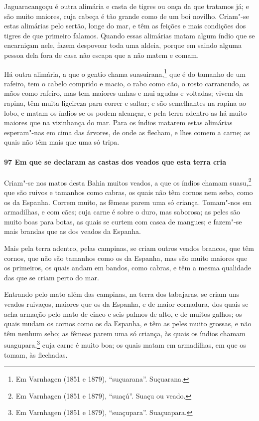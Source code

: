 \begin{linenumbers}
Jaguaracangoçu é outra alimária e casta de tigres ou onça da que tratamos já; e são muito
maiores, cuja cabeça é tão grande como de um boi novilho. Criam"-se estas alimárias pelo
sertão, longe do mar, e têm as feições e mais condições dos tigres de que primeiro
falamos. Quando essas alimárias matam algum índio que se encarniçam nele, fazem despovoar
toda uma aldeia, porque em saindo alguma pessoa dela fora de casa não escapa que a não
matem e comam.

Há outra alimária, a que o gentio chama suasuirana,\footnote{ Em Varnhagen (1851 e 1879),
``suçuarana''. Suçuarana.} que é do tamanho de um rafeiro, tem o cabelo comprido e macio,
o rabo como cão, o rosto carrancudo, as mãos como rafeiro, mas tem maiores unhas e mui
agudas e voltadas; vivem da rapina, têm muita ligeireza para correr e saltar; e são
semelhantes na rapina ao lobo, e matam os índios se os podem alcançar, e pela terra
adentro as há muito maiores que na vizinhança do mar. Para os índios matarem estas
alimárias esperam"-nas em cima das árvores, de onde as flecham, e lhes comem a carne; as
quais não têm mais que uma só tripa.

\paragraph{97 Em que se declaram as castas dos veados que esta terra cria}\quad
Criam"-se nos matos desta Bahia muitos veados, a que os índios chamam suasu,\footnote{ Em
Varnhagen (1851 e 1879), ``suaçú''. Suaçu ou veado.} que são ruivos e tamanhos como
cabras, os quais não têm cornos nem sebo, como os da Espanha. Correm muito, as fêmeas
parem uma só criança. Tomam"-nos em armadilhas, e com cães; cuja carne é sobre o duro, mas
saborosa; as peles são muito boas para botas, as quais se curtem com casca de mangues; e
fazem"-se mais brandas que as dos veados da Espanha.

Mais pela terra adentro, pelas campinas, se criam outros veados brancos, que têm cornos,
que não são tamanhos como os da Espanha, mas são muito maiores que os primeiros, os quais
andam em bandos, como cabras, e têm a mesma qualidade das que se criam perto do mar.

Entrando pelo mato além das campinas, na terra dos tabajaras, se criam uns veados
ruivaços, maiores que os da Espanha, e de maior cornadura, dos quais se acha armação pelo
mato de cinco e seis palmos de alto, e de muitos galhos; os quais mudam os cornos como os
da Espanha, e têm as peles muito grossas, e não têm nenhum sebo; as fêmeas parem uma só
criança, às quais os índios chamam suagupara,\footnote{ Em Varnhagen (1851 e 1879),
``suaçupara''. Suaçuapara.} cuja carne é muito boa; os quais matam em armadilhas, em que
os tomam, às flechadas.


\end{linenumbers}
